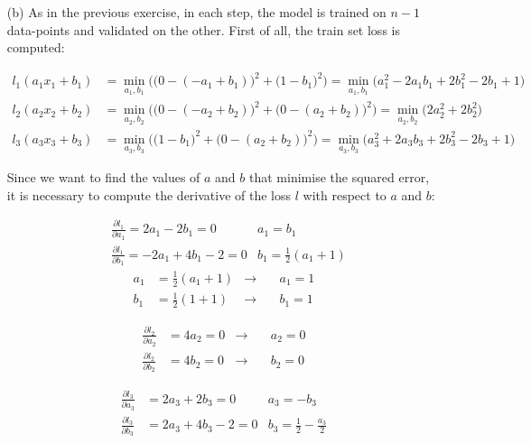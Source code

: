 {\begin{itemize}
		The final error is computed as the mean of the validation errors: 
		\begin{equation*}
			E=\frac{e_1+e_2+e_3}{3}=\frac{\frac{1}{4}+1+\frac{1}{4}}{3}=\frac{1}{2}
		\end{equation*}
		
		\item[(b)] As in the previous exercise, in each step, the model is 
		trained on $n-1$ data-points and validated on the other. First of all, 
		the train set loss is computed:
		
		\begin{align*}
		l_1(a_1x_1+b_1) & = \min_{a_1,b_1} \bigg(\big(0-({-a_1+b_1})\big)^2 + 
		\big(1-b_1\big)^2 \bigg) = \min_{a_1,b_1} \big( a_1^2 - 2 a_1 b_1 + 2 
		b_1^2 - 2 b_1 + 1 \big) \\
		l_2(a_2x_2+b_2) & = \min_{a_2,b_2} \bigg(\big(0-({-a_2+b_2})\big)^2 + 
		\big(0-({a_2+b_2})\big)^2\bigg) =\min_{a_2,b_2}\big( 2 a_2^2 + 2 b_2^2 
		\big) 
		\\
		l_3(a_3x_3+b_3) & = \min_{a_3,b_3} \bigg(\big(1-b_1\big)^2 + 
		\big(0-({a_2+b_2})\big)^2\bigg) =  \min_{a_3,b_3}\big(a_3^2 + 2 a_3 b_3 
		+ 2 b_3^2 - 2 b_3 + 1 \big)
		\end{align*}
		
		Since we want to find the values of $a$ and $b$ that minimise the 
		squared error, it is necessary to compute the derivative of the loss 
		$l$ with respect to $a$ and $b$:
		
		\begin{align*}
		&\frac{\partial l_1}{\partial a_1} = 2 a_1 - 2 b_1 = 0  
		& a_1 = b_1 \\
		&\frac{\partial l_1}{\partial b_1} = -2 a_1 + 4 b_1 - 2 = 0  
		& b_1 = \frac{1}{2} (a_1 + 1)
		\end{align*}
		\begin{align*}
		a_1 &= \frac{1}{2} (a_1 + 1)  &\rightarrow &\quad a_1 = 1\\
		b_1 &= \frac{1}{2} (1 + 1)  &\rightarrow& \quad b_1 = 1
		\end{align*}
		
		\begin{align*}
		\frac{\partial l_2}{\partial a_2} & = 4 a_2 = 0  
		&\rightarrow &\quad a_2 = 0  \\
		\frac{\partial l_2}{\partial b_2} & = 4 b_2 = 0  
		&\rightarrow &\quad b_2 = 0
		\end{align*}
		
		
		\begin{align*}
		\frac{\partial l_3}{\partial a_3} & = 2a_3+2b_3= 0  
		& a_3 = -b_3 \\
		\frac{\partial l_3}{\partial b_3} & = 2 a_3 + 4 b_3 - 2 = 0  
		& b_3 = \frac{1}{2} - \frac{a_3}{2}
		\end{align*}
		

\end{itemize}}
